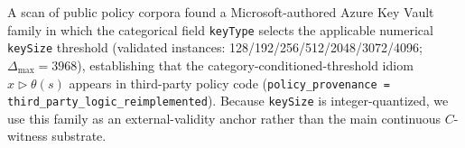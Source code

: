 A scan of public policy corpora found a Microsoft-authored Azure Key Vault family in which the categorical field \texttt{keyType} selects the applicable numerical \texttt{keySize} threshold (validated instances: 128/192/256/512/2048/3072/4096; $\Delta_{\max}=3968$), establishing that the category-conditioned-threshold idiom $x \triangleright \theta(s)$ appears in third-party policy code (\texttt{policy\_provenance = third\_party\_logic\_reimplemented}). Because \texttt{keySize} is integer-quantized, we use this family as an external-validity anchor rather than the main continuous $C$-witness substrate.
